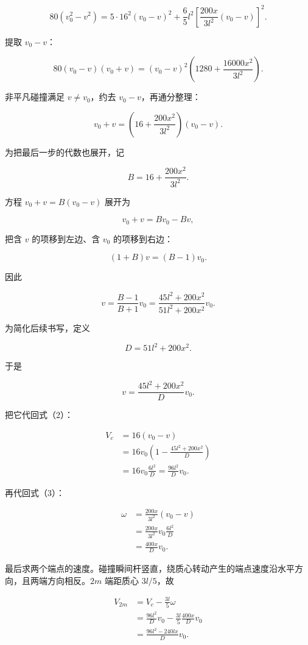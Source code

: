 \documentclass[12pt,a4paper,UTF8]{ctexart}
\begin{document}
\[80(v_0^2-v^2)
=5\cdot16^2(v_0-v)^2
+\frac65l^2\left[\frac{200x}{3l^2}(v_0-v)\right]^2.\]

提取 \(v_0-v\)：

\[80(v_0-v)(v_0+v)
=(v_0-v)^2\left(1280+\frac{16000x^2}{3l^2}\right).\]

非平凡碰撞满足 \(v\neq v_0\)，约去 \(v_0-v\)，再通分整理：

\[v_0+v
=\left(16+\frac{200x^2}{3l^2}\right)(v_0-v).\]

为把最后一步的代数也展开，记

\[B=16+\frac{200x^2}{3l^2}.\]

方程 \(v_0+v=B(v_0-v)\) 展开为

\[v_0+v=Bv_0-Bv,\]

把含 \(v\) 的项移到左边、含 \(v_0\) 的项移到右边：

\[(1+B)v=(B-1)v_0.\]

因此

\[v=\frac{B-1}{B+1}v_0
=\frac{45l^2+200x^2}{51l^2+200x^2}v_0.\]

为简化后续书写，定义

\[D=51l^2+200x^2.\]

于是

\[\boxed{v=\frac{45l^2+200x^2}{D}v_0}.\]

把它代回式（2）：

\[\begin{aligned}
V_c
&=16(v_0-v)\\
&=16v_0\left(1-\frac{45l^2+200x^2}{D}\right)\\
&=16v_0\frac{6l^2}{D}
=\boxed{\frac{96l^2}{D}v_0}.
\end{aligned}\]

再代回式（3）：

\[\begin{aligned}
\omega
&=\frac{200x}{3l^2}(v_0-v)\\
&=\frac{200x}{3l^2}v_0\frac{6l^2}{D}\\
&=\boxed{\frac{400x}{D}v_0}.
\end{aligned}\]

最后求两个端点的速度。碰撞瞬间杆竖直，绕质心转动产生的端点速度沿水平方向，且两端方向相反。\(2m\)
端距质心 \(3l/5\)，故

\[\begin{aligned}
V_{2m}
&=V_c-\frac{3l}{5}\omega\\
&=\frac{96l^2}{D}v_0
-\frac{3l}{5}\frac{400x}{D}v_0\\
&=\boxed{\frac{96l^2-240lx}{D}v_0}.
\end{aligned}\]
\end{document}
